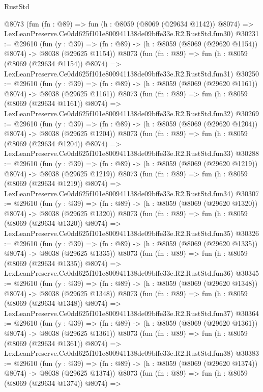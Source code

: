 \begin{lexlean}{RustStd}
\begin{coremodule}
    @8073
    (fun (fn : @89) =>
    fun (h : @8059 (@8069 (@29634 @1142)) @8074) =>
    LexLeanPreserve.Ce0dd625f101e800941138de09bffe33e.R2.RustStd.fun30)
@30231 := @29610
    (fun (y : @39) =>
    (fn : @89) -> (h : @8059 (@8069 (@29620 @1154)) @8074) -> @8038 (@29625 @1154))
    @8073
    (fun (fn : @89) =>
    fun (h : @8059 (@8069 (@29634 @1154)) @8074) =>
    LexLeanPreserve.Ce0dd625f101e800941138de09bffe33e.R2.RustStd.fun31)
@30250 := @29610
    (fun (y : @39) =>
    (fn : @89) -> (h : @8059 (@8069 (@29620 @1161)) @8074) -> @8038 (@29625 @1161))
    @8073
    (fun (fn : @89) =>
    fun (h : @8059 (@8069 (@29634 @1161)) @8074) =>
    LexLeanPreserve.Ce0dd625f101e800941138de09bffe33e.R2.RustStd.fun32)
@30269 := @29610
    (fun (y : @39) =>
    (fn : @89) -> (h : @8059 (@8069 (@29620 @1204)) @8074) -> @8038 (@29625 @1204))
    @8073
    (fun (fn : @89) =>
    fun (h : @8059 (@8069 (@29634 @1204)) @8074) =>
    LexLeanPreserve.Ce0dd625f101e800941138de09bffe33e.R2.RustStd.fun33)
@30288 := @29610
    (fun (y : @39) =>
    (fn : @89) -> (h : @8059 (@8069 (@29620 @1219)) @8074) -> @8038 (@29625 @1219))
    @8073
    (fun (fn : @89) =>
    fun (h : @8059 (@8069 (@29634 @1219)) @8074) =>
    LexLeanPreserve.Ce0dd625f101e800941138de09bffe33e.R2.RustStd.fun34)
@30307 := @29610
    (fun (y : @39) =>
    (fn : @89) -> (h : @8059 (@8069 (@29620 @1320)) @8074) -> @8038 (@29625 @1320))
    @8073
    (fun (fn : @89) =>
    fun (h : @8059 (@8069 (@29634 @1320)) @8074) =>
    LexLeanPreserve.Ce0dd625f101e800941138de09bffe33e.R2.RustStd.fun35)
@30326 := @29610
    (fun (y : @39) =>
    (fn : @89) -> (h : @8059 (@8069 (@29620 @1335)) @8074) -> @8038 (@29625 @1335))
    @8073
    (fun (fn : @89) =>
    fun (h : @8059 (@8069 (@29634 @1335)) @8074) =>
    LexLeanPreserve.Ce0dd625f101e800941138de09bffe33e.R2.RustStd.fun36)
@30345 := @29610
    (fun (y : @39) =>
    (fn : @89) -> (h : @8059 (@8069 (@29620 @1348)) @8074) -> @8038 (@29625 @1348))
    @8073
    (fun (fn : @89) =>
    fun (h : @8059 (@8069 (@29634 @1348)) @8074) =>
    LexLeanPreserve.Ce0dd625f101e800941138de09bffe33e.R2.RustStd.fun37)
@30364 := @29610
    (fun (y : @39) =>
    (fn : @89) -> (h : @8059 (@8069 (@29620 @1361)) @8074) -> @8038 (@29625 @1361))
    @8073
    (fun (fn : @89) =>
    fun (h : @8059 (@8069 (@29634 @1361)) @8074) =>
    LexLeanPreserve.Ce0dd625f101e800941138de09bffe33e.R2.RustStd.fun38)
@30383 := @29610
    (fun (y : @39) =>
    (fn : @89) -> (h : @8059 (@8069 (@29620 @1374)) @8074) -> @8038 (@29625 @1374))
    @8073
    (fun (fn : @89) =>
    fun (h : @8059 (@8069 (@29634 @1374)) @8074) =>

\end{coremodule}
\end{lexlean}
